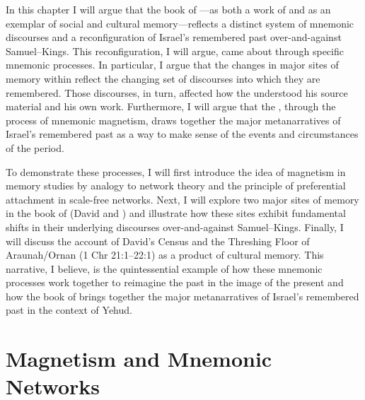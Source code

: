 In this chapter I will argue that the book of \chronicles---as both a work of \rwb and as an exemplar of social and cultural memory---reflects a distinct system of mnemonic discourses and a reconfiguration of Israel's remembered past over-and-against Samuel--Kings. This reconfiguration, I will argue, came about through specific mnemonic processes. In particular, I argue that the changes in major sites of memory within \chronicles reflect the changing set of discourses into which they are remembered. Those discourses, in turn, affected how the \chronicler understood his source material and his own work. Furthermore, I will argue that the \chronicler, through the process of mnemonic magnetism, draws together the major metanarratives of Israel's remembered past as a way to make sense of the events and circumstances of the \secondtemple period.

To demonstrate these processes, I will first introduce the idea of magnetism in memory studies by analogy to network theory and the principle of preferential attachment in scale-free networks. Next, I will explore two major sites of memory in the book of \chronicles (David and \thetemple) and illustrate how these sites exhibit fundamental shifts in their underlying discourses over-and-against Samuel--Kings. Finally, I will discuss the account of David's Census and the Threshing Floor of Araunah/Ornan (1 Chr 21:1--22:1) as a product of cultural memory. This narrative, I believe, is the quintessential example of how these mnemonic processes work together to reimagine the past in the image of the present and how the book of \chronicles brings together the major metanarratives of Israel's remembered past in the context of \secondtemple Yehud.

\section{Magnetism and Mnemonic Networks}

